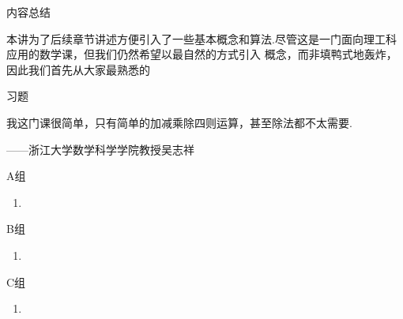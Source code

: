 \vspace{2ex}
\centerline{\heiti \Large 内容总结}
\vspace{2ex}

本讲为了后续章节讲述方便引入了一些基本概念和算法.尽管这是一门面向理工科应用的数学课，但我们仍然希望以最自然的方式引入
概念，而非填鸭式地轰炸，因此我们首先从大家最熟悉的

\centerline{\heiti \Large 习题}
\vspace{2ex}
{\kaishu 我这门课很简单，只有简单的加减乘除四则运算，甚至除法都不太需要.}
\begin{flushright}
    \kaishu
    ——浙江大学数学科学学院教授吴志祥
\end{flushright}
\centerline{\heiti A组}
\begin{enumerate}
    \item
\end{enumerate}
\centerline{\heiti B组}
\begin{enumerate}
    \item
\end{enumerate}
\centerline{\heiti C组}
\begin{enumerate}
    \item
\end{enumerate}
